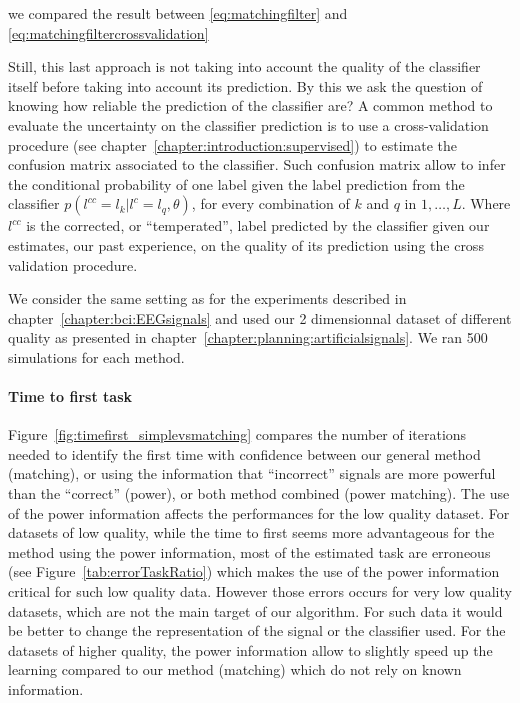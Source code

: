 we compared the result between 
\ref{eq:matchingfilter}
and
\ref{eq:matchingfiltercrossvalidation} 

Still, this last approach is not taking into account the quality of the classifier itself before taking into account its prediction. By this we ask the question of knowing how reliable the prediction of the classifier are? A common method to evaluate the uncertainty on the classifier prediction is to use a cross-validation procedure (see chapter~\ref{chapter:introduction:supervised}) to estimate the confusion matrix associated to the classifier. Such confusion matrix allow to infer the conditional probability of one label given the label prediction from the classifier $p(l^{cc} = l_k| l^c = l_q, \theta)$, for every combination of $k$ and $q$ in $1, \ldots, L$. Where $l^{cc}$ is the corrected, or ``temperated'', label predicted by the classifier given our estimates, our past experience, on the quality of its prediction using the cross validation procedure.

We consider the same setting as for the experiments described in chapter~\ref{chapter:bci:EEGsignals} and used our 2 dimensionnal dataset of different quality as presented in chapter~\ref{chapter:planning:artificialsignals}. We ran 500 simulations for each method.








\paragraph{Time to first task} Figure~\ref{fig:timefirst_simplevsmatching} compares the number of iterations needed to identify the first time with confidence between our general method (matching), or using the information that ``incorrect'' signals are more powerful than the ``correct'' (power), or both method combined (power matching). The use of the power information affects the performances for the low quality dataset. For datasets of low quality, while the time to first seems more advantageous for the method using the power information, most of the estimated task are erroneous (see Figure~\ref{tab:errorTaskRatio}) which makes the use of the power information critical for such low quality data. However those errors occurs for very low quality datasets, which are not the main target of our algorithm. For such data it would be better to change the representation of the signal or the classifier used. For the datasets of higher quality, the power information allow to slightly speed up the learning compared to our method (matching) which do not rely on known information. 

